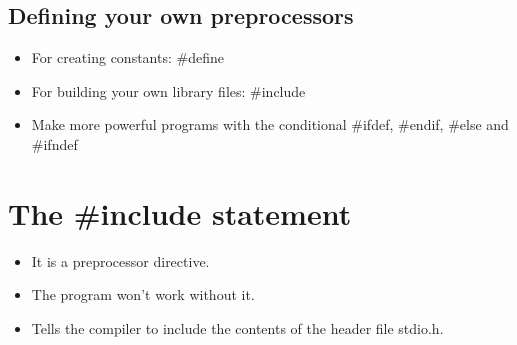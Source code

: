 \subsection{Defining your own preprocessors}
\begin{itemize}
    \item For creating constants: \#define 
    \item For building your own library files: \#include 
    \item Make more powerful programs with the conditional \#ifdef, \#endif, \#else and \#ifndef 
\end{itemize}


\section{The \#include statement}
\begin{itemize}
    \item It is a preprocessor directive. 
    \item The program won't work without it. 
    \item Tells the compiler to include the contents of the header file stdio.h.
\end{itemize}

